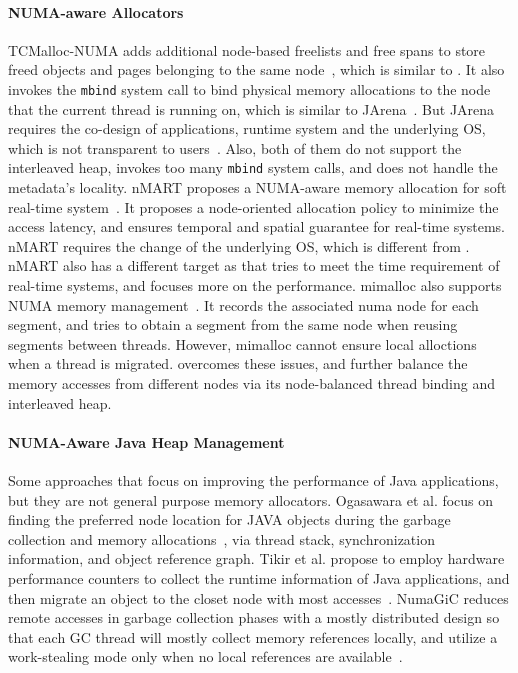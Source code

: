 \paragraph{NUMA-aware Allocators} TCMalloc-NUMA adds additional node-based freelists and free spans to store freed objects and pages belonging to the same node~\cite{tcmallocnew}, which is similar to \NM{}. It also invokes the \texttt{mbind} system call to bind physical memory allocations to the node that the current thread is running on, which is similar to JArena~\cite{yang2019jarena}. But JArena requires the co-design of applications, runtime system and the underlying OS, which is not transparent to users~\cite{yang2019jarena}. Also, both of them do not support the interleaved heap, invokes too many \texttt{mbind} system calls, and does not handle the metadata's locality. nMART proposes a NUMA-aware memory allocation for soft real-time system~\cite{kim2013node}. It proposes a node-oriented allocation policy to minimize the access latency, and ensures temporal and spatial guarantee for real-time systems. nMART requires the change of the underlying OS, which is different from \NM{}. nMART also has a different target as \NM{} that tries to meet the time requirement of real-time systems, and \NM{} focuses more on the performance. mimalloc also supports NUMA memory management~\cite{mimalloc}. It records the associated numa node for each segment, and tries to obtain a segment from the same node when reusing segments between threads. However, mimalloc cannot ensure local alloctions when a thread is migrated. \NM{} overcomes these issues, and further balance the memory accesses from different nodes via its node-balanced thread binding and interleaved heap. 


\paragraph{NUMA-Aware Java Heap Management} Some approaches that focus on improving the performance of Java applications, but they are not general purpose memory allocators. Ogasawara et al. focus on finding the preferred node location for JAVA objects during the garbage collection and memory allocations~\cite{Ogasawara:2009:NMM:1640089.1640117}, via thread stack, synchronization information, and object reference graph. Tikir et al. propose to employ hardware performance counters to collect the runtime information of Java applications, and then migrate an object to the closet node with most accesses~\cite{1419934}. 
NumaGiC reduces remote accesses in garbage collection phases with a mostly distributed design so that each GC thread will mostly collect memory references locally, and utilize a work-stealing mode only when no local references are available~\cite{NumaGiC}.



